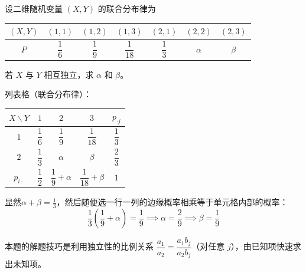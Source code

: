 ﻿\documentclass[lang=cn,11pt]{elegantbook}
\begin{document}
\begin{exercise}[由独立性求未知参数] \label{exer:3-3c}
设二维随机变量 $(X,Y)$ 的联合分布律为
\begin{center}
\begin{tabular}{c|cccccc}
\toprule
$(X,Y)$ & $(1,1)$ & $(1,2)$ & $(1,3)$ & $(2,1)$ & $(2,2)$ & $(2,3)$ \\
\midrule
$P$ & $\dfrac{1}{6}$ & $\dfrac{1}{9}$ & $\dfrac{1}{18}$ & $\dfrac{1}{3}$ & $\alpha$ & $\beta$ \\
\bottomrule
\end{tabular}
\end{center}
若 $X$ 与 $Y$ 相互独立，求 $\alpha$ 和 $\beta$。
\end{exercise}
\begin{solution}
列表格（联合分布律）：
\begin{center}
\begin{tabular}{c|ccc|c}
\toprule
$X \backslash Y$ & $1$ & $2$ & $3$ & $p_{\cdot j}$ \\
\midrule
$1$ & $\dfrac{1}{6}$ & $\dfrac19$ & $\dfrac{1}{18}$ & $\dfrac{1}{3}$ \\[6pt]
$2$ & $\dfrac13$ & $\alpha$ & $\beta$ & $\dfrac{2}{3}$ \\
\midrule
$p_{i\cdot}$ & $\dfrac{1}{2}$ & $\dfrac{1}{9}+\alpha$ & $\dfrac{1}{18}+\beta$ & $1$ \\
\bottomrule
\end{tabular}
\end{center}
显然$\alpha+\beta=\frac13$，然后随便选一行一列的边缘概率相乘等于单元格内部的概率：
\[\frac13(\frac19+\alpha)=\frac19\implies \alpha=\frac29\implies \beta=\frac19\]
\begin{note}
本题的解题技巧是利用独立性的比例关系 $\dfrac{a_1}{a_2} = \dfrac{a_1 b_j}{a_2 b_j}$（对任意 $j$），由已知项快速求出未知项。
\end{note}
\end{solution}
\end{document}
